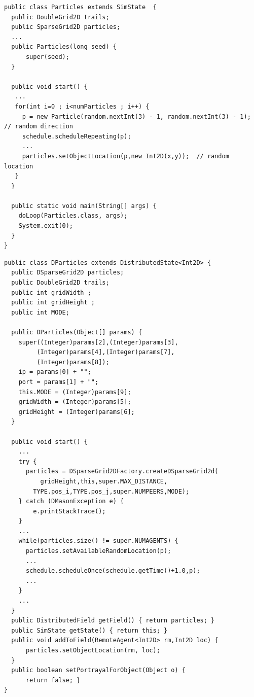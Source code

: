 \documentclass[12pt]{article}
\begin{document}
\begin{lstlisting}
public class Particles extends SimState  {
  public DoubleGrid2D trails;
  public SparseGrid2D particles;
  ...
  public Particles(long seed) {
      super(seed);
  }
  
  public void start() {
   ...
   for(int i=0 ; i<numParticles ; i++) {
     p = new Particle(random.nextInt(3) - 1, random.nextInt(3) - 1);  // random direction
     schedule.scheduleRepeating(p);
     ...
     particles.setObjectLocation(p,new Int2D(x,y));  // random location
   }
  }
  
  public static void main(String[] args) {
    doLoop(Particles.class, args);
    System.exit(0);
  }
}
\end{lstlisting}
\medskip
{}
\begin{lstlisting}
public class DParticles extends DistributedState<Int2D> {
  public DSparseGrid2D particles;
  public DoubleGrid2D trails;
  public int gridWidth ;
  public int gridHeight ;
  public int MODE;
	
  public DParticles(Object[] params) {
    super((Integer)params[2],(Integer)params[3],
         (Integer)params[4],(Integer)params[7],
         (Integer)params[8]);
    ip = params[0] + "";
    port = params[1] + "";
    this.MODE = (Integer)params[9];
    gridWidth = (Integer)params[5];
    gridHeight = (Integer)params[6];
  }
  
  public void start() {
    ...
    try {
      particles = DSparseGrid2DFactory.createDSparseGrid2d(
	      gridHeight,this,super.MAX_DISTANCE,
      	TYPE.pos_i,TYPE.pos_j,super.NUMPEERS,MODE);
    } catch (DMasonException e) { 
    	e.printStackTrace();
    }
    ...
    while(particles.size() != super.NUMAGENTS) {
      particles.setAvailableRandomLocation(p);
      ...
      schedule.scheduleOnce(schedule.getTime()+1.0,p);
      ...
    }
	...
  }
  public DistributedField getField() { return particles; }
  public SimState getState() { return this; }
  public void addToField(RemoteAgent<Int2D> rm,Int2D loc) {
      particles.setObjectLocation(rm, loc);
  }
  public boolean setPortrayalForObject(Object o) { 
      return false; }
}
\end{lstlisting}
\end{document}
